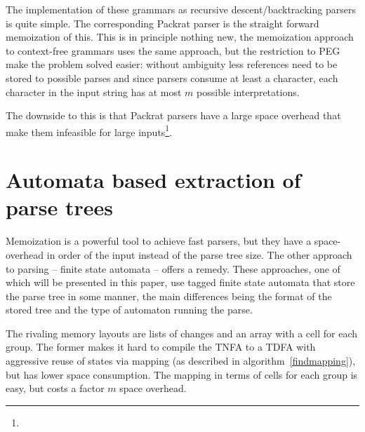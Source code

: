 \documentclass[11pt,a4paper,twoside,openright]{Thesis}
\theoremstyle{definition}
\newcommand{\seclabel}[1]{\label{sec:#1}}
\begin{document}
The implementation of these grammars as recursive descent/backtracking
parsers is quite simple. The corresponding Packrat parser is the straight
forward memoization of this. This is in principle nothing new, the
memoization approach to context-free grammars uses the same approach, but the
restriction to PEG make the problem solved easier: without ambiguity less
references need to be stored to possible parses and since parsers consume at
least a character, each character in the input string has at most $m$
possible interpretations.

The downside to this is that Packrat parsers have a large space overhead that
make them infeasible for large
inputs\cite{Beck08a}\footnote{}.

\section{Automata based extraction of parse trees}\seclabel{parse-trees-related}
Memoization is a powerful tool to achieve fast parsers, but they have a
space-overhead in order of the input instead of the parse tree size. The
other approach to parsing -- finite state automata -- offers a remedy. These
approaches, one of which will be presented in this paper, use tagged finite
state automata that store the parse tree in some manner, the main differences
being the format of the stored tree and the type of automaton running the parse.

The rivaling memory layouts are lists of changes and an array with a cell for
each group. The former makes it hard to compile the TNFA to a TDFA with
aggressive reuse of states via mapping (as described in
algorithm~\ref{findmapping}), but has lower space consumption. The mapping in
terms of cells for each group is easy, but costs a factor $m$ space overhead.
\end{document}

